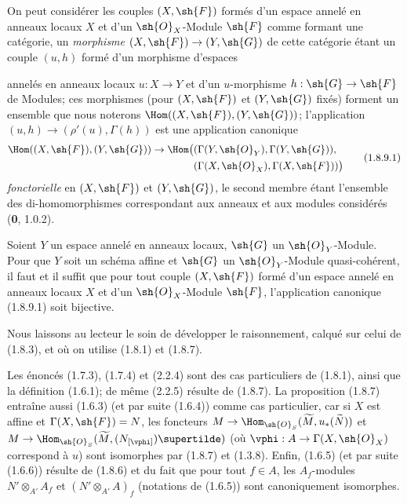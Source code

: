 \begin{env}[1.8.9]
\label{ega2:addendum:I.1.8.9-fr}
On peut considérer les couples $(X,\sh{F})$ formés d'un espace annelé
en anneaux locaux $X$ et d'un $\sh{O}_X$-Module $\sh{F}$ comme formant
une catégorie, un \emph{morphisme} $(X,\sh{F})\to(Y,\sh{G})$ de cette catégorie
étant un couple $(u,h)$ formé d'un morphisme d'espaces
annelés en anneaux locaux $u:X\to Y$ et d'un $u$-morphisme
$h:\sh{G}\to\sh{F}$ de Modules; ces
morphismes (pour $(X,\sh{F})$ et $(Y,\sh{G})$ fixés) forment un ensemble
que nous noterons $\Hom((X,\sh{F}),(Y,\sh{G}))$; l'application
$(u,h)\to(\rho'(u),\Gamma(h))$ est une application canonique
\begin{equation}
\label{ega2:addendum:I.1.8.9.1-fr}
\begin{split}
  \Hom((X,\sh{F}),(Y,\sh{G}))\to
  \Hom\bigl(
    &(\Gamma(Y,\sh{O}_Y),\Gamma(Y,\sh{G})),\\
    &(\Gamma(X,\sh{O}_X),\Gamma(X,\sh{F}))
  \bigr)
\end{split}
\tag{1.8.9.1}
\end{equation}
\emph{fonctorielle} en $(X,\sh{F})$ et $(Y,\sh{G})$, le second membre étant
l'ensemble des di-homomorphismes correspondant aux anneaux et aux
modules considérés (\textbf{0}, 1.0.2).
\end{env}

\begin{corollary}[1.8.10]
\label{ega2:addendum:I.1.8.10-fr}
Soient $Y$ un espace annelé en anneaux locaux, $\sh{G}$ un
$\sh{O}_Y$-Module. Pour que $Y$ soit un schéma affine et $\sh{G}$ un
$\sh{O}_Y$-Module quasi-cohérent, il faut et il suffit que pour tout
couple $(X,\sh{F})$ formé d'un espace annelé en anneaux locaux $X$ et
d'un $\sh{O}_X$-Module $\sh{F}$, l'application canonique \textup{(1.8.9.1)} soit
bijective.
\end{corollary}

Nous laissons au lecteur le soin de développer le raisonnement, calqué
sur celui de (1.8.3), et où on utilise (1.8.1) et (1.8.7).

\begin{remark}[1.8.11]
\label{ega2:addendum:I.1.8.11-fr}
Les énoncés (1.7.3), (1.7.4) et (2.2.4) sont des cas
particuliers de (1.8.1), ainsi que la définition (1.6.1); de même
(2.2.5) résulte de (1.8.7). La proposition (1.8.7) entraîne aussi
(1.6.3) (et par suite (1.6.4)) comme cas particulier, car si $X$
est affine et $\Gamma(X,\sh{F})=N$, les foncteurs
$M\to
  \Hom_{\sh{O}_S}(\widetilde M,u_*(\widetilde N))$ et
$M\to
  \Hom_{\sh{O}_S}(\widetilde M,(N_{[\vphi]})\supertilde)$
(où $\vphi:A\to\Gamma(X,\sh{O}_X)$ correspond à $u$) sont isomorphes
par (1.8.7) et (1.3.8). Enfin, (1.6.5) (et par suite (1.6.6))
résulte de (1.8.6) et du fait que pour tout $f\in A$, les $A_f$-modules
$N'\otimes_{A'}A_f$ et $(N'\otimes_{A'}A)_f$
(notations de (1.6.5)) sont canoniquement isomorphes.
\end{remark}

